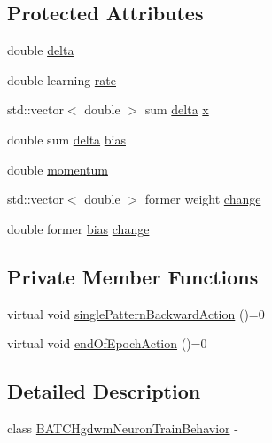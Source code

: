 \subsection*{Protected Attributes}
\begin{DoxyCompactItemize}
\item 
double \hyperlink{class_b_a_t_c_hgdwm_neuron_train_behavior_a68dcc956fa80cfa014543bbc2567fd97}{delta}
\item 
double learning \hyperlink{class_b_a_t_c_hgdwm_neuron_train_behavior_add4587d6689b8a8f8478058578c88c3a}{rate}
\item 
std::vector$<$ double $>$ sum \hyperlink{class_b_a_t_c_hgdwm_neuron_train_behavior_a68dcc956fa80cfa014543bbc2567fd97}{delta} \hyperlink{class_b_a_t_c_hgdwm_neuron_train_behavior_ae6e7df3f35d52af0f285a9ec35e946f6}{x}
\item 
double sum \hyperlink{class_b_a_t_c_hgdwm_neuron_train_behavior_a68dcc956fa80cfa014543bbc2567fd97}{delta} \hyperlink{class_b_a_t_c_hgdwm_neuron_train_behavior_a431837463ccd5c03227dd9ea0f077e31}{bias}
\item 
double \hyperlink{class_b_a_t_c_hgdwm_neuron_train_behavior_ae58617ea1ae40624e9bae3441fb36bc8}{momentum}
\item 
std::vector$<$ double $>$ former weight \hyperlink{class_b_a_t_c_hgdwm_neuron_train_behavior_ae74125bcb50340b4c75e3716ca409978}{change}
\item 
double former \hyperlink{class_b_a_t_c_hgdwm_neuron_train_behavior_a431837463ccd5c03227dd9ea0f077e31}{bias} \hyperlink{class_b_a_t_c_hgdwm_neuron_train_behavior_a29ffa5e56fdd2a551cb200c549960db4}{change}
\end{DoxyCompactItemize}
\subsection*{Private Member Functions}
\begin{DoxyCompactItemize}
\item 
virtual void \hyperlink{class_b_a_t_c_hgdwm_neuron_train_behavior_a768783bedb8e82c37614c24d3eebb2df}{singlePatternBackwardAction} ()=0
\item 
virtual void \hyperlink{class_b_a_t_c_hgdwm_neuron_train_behavior_acaa9a687c9d0e21d44a9c3ad7ae695a6}{endOfEpochAction} ()=0
\end{DoxyCompactItemize}


\subsection{Detailed Description}
class \hyperlink{class_b_a_t_c_hgdwm_neuron_train_behavior}{BATCHgdwmNeuronTrainBehavior} -\/ 

